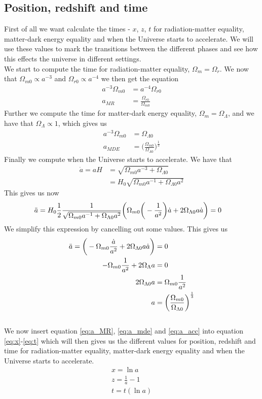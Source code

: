 \documentclass{article}
\begin{document}
\begin{multicols}{2}
\subsection{Position, redshift and time }
First of all we want calculate the times - $x$, $z$, $t$ for radiation-matter equality, matter-dark energy equality and when the Universe starts to accelerate. We will use these values to mark the transitions between the different phases and see how this effects the universe in different settings.\\
We start to compute the time for radiation-matter equality, $\Omega_{m}=\Omega_{r}$. We now that $\Omega_{m0}\propto a^{-3}$ and $\Omega_{r0}\propto a^{-4}$ we then get the equation
\begin{align}
    a^{-3}\Omega_{m0}&=a^{-4}\Omega_{r0}\\
    a_{MR}&=\frac{\Omega_{r0}}{\Omega_{m0}} \label{eq:a_MR}
\end{align}
Further we compute the time for matter-dark energy equality, $\Omega_{m}=\Omega_{\Lambda}$, and we have that $\Omega_{\Lambda}\propto 1$, which gives us
\begin{align}
    a^{-3}\Omega_{m0}&=\Omega_{\Lambda0}\\
    a_{MDE}&=\bigg(\frac{\Omega_{m0}}{\Omega_{\Lambda0}}\bigg)^{\frac{1}{3}} \label{eq:a_mde}
\end{align}
Finally we compute when the Universe starts to accelerate. We have that 
\begin{align}
    \Dot{a}=aH&=\sqrt{\Omega_{m0}a^{-3}+\Omega_{\Lambda0}}\\
    &=H_0\sqrt{\Omega_{m0}a^{-1}+\Omega_{\Lambda0} a^2}
\end{align}
This gives us now 
\begin{align}
    \Ddot{a}&=H_0\frac{1}{2}\frac{1}{\sqrt{\Omega_{m0}a^{-1}+\Omega_{\Lambda0} a^2}}\bigg(\Omega_{m0}\bigg(-\frac{1}{a^2}\bigg)\Dot{a}+2\Omega_{\Lambda0} a\Dot{a}\bigg)=0
\end{align}
We simplify this expression by cancelling out some values. This gives us
\begin{align}
    \Ddot{a}=\bigg(-\Omega_{m0}\frac{\Dot{a}}{a^2}+2\Omega_{\Lambda0} a\Dot{a}\bigg)&=0\\
    -\Omega_{m0}\frac{1}{a^2}+2\Omega_\Lambda a&=0\\
    2\Omega_{\Lambda0} a&=\Omega_{m0}\frac{1}{a^2}\\
    a&=\bigg(\frac{\Omega_{m0}}{\Omega_{\Lambda0}}\bigg)^\frac{1}{3} \label{eq:a_acc}
\end{align}
\\
We now insert equation \eqref{eq:a_MR}, \eqref{eq:a_mde} and \eqref{eq:a_acc} into equation \eqref{eq:x}-\eqref{eq:t} which will then gives us the different values for position, redshift and time for radiation-matter equality, matter-dark energy equality and when the Universe starts to accelerate.
\begin{align}
    x=\ln{a} \label{eq:x}\\
    z = \frac{1}{a}-1 \label{eq:z}\\
    t=t(\ln{a}) \label{eq:t}
\end{align}

\end{multicols}
\end{document}
